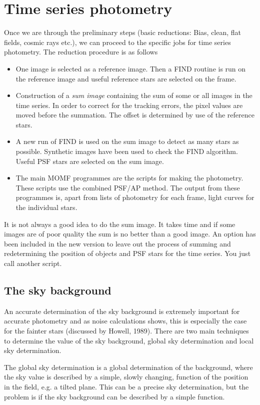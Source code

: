 \documentclass[]{article}
\begin{document}
\section{Time series photometry}
Once we are through the preliminary steps (basic reductions: Bias, 
clean, flat
fields, cosmic rays etc.), we
can proceed to the specific jobs for time series
photometry. 
The reduction procedure is as follows
\begin{itemize}
\item One image is selected as a reference image. Then a
FIND routine is run on the
reference image and useful reference stars are selected 
on the frame.
\item Construction of a {\em sum image} containing the
sum of some or all images in the time series.
In order to correct for
the tracking errors, the pixel values are moved before the 
summation.
The offset is determined by use of the reference stars.
\item A new run of FIND is used on the
sum image to detect as many stars as possible. Synthetic images
have been used to check the FIND algorithm.
Useful PSF stars are selected on the sum image.
\item The main MOMF programmes are the scripts for 
making
the photometry. These scripts use the combined PSF/AP
method.
The output from these programmes is, apart from lists of
photometry for each frame, light curves for the individual stars.
\end{itemize}

It is not always a good idea to do the sum image. It takes time and
if some images are of poor quality the sum is no better than a
good image. An option has been included in the new version to
leave out the process of summing and redetermining the position
of objects and PSF stars for the time series. You just call another
script.
\subsection{The sky background}
An accurate determination of the sky background is extremely
important for accurate photometry and as noise calculations shows,
this is especially the case for the fainter stars (discussed by Howell, 
1989).
There are two main techniques to determine 
the value of the sky background,
global sky determination and local sky
determination.
 
The global sky determination is a global determination of the 
background,
where the sky value is described by a simple, slowly changing, 
function of
the position in the field, e.g. a tilted plane. This can be a
precise sky determination, but the problem is if the sky background
can be described by a simple function.
 
\end{document}
